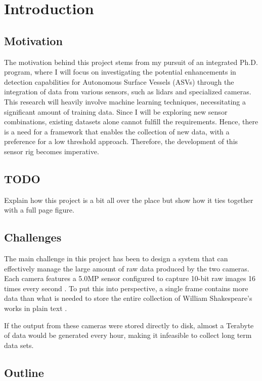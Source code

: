 \chapter{Introduction}

\section{Motivation}

The motivation behind this project stems from my pursuit of an integrated Ph.D.
program, where I will focus on investigating the potential enhancements in detection capabilities for Autonomous Surface Vessels (ASVs) through the integration of data from various sensors, such as lidars and specialized cameras.
This research will heavily involve machine learning techniques, necessitating a significant amount of training data.
Since I will be exploring new sensor combinations, existing datasets alone cannot fulfill the requirements.
Hence, there is a need for a framework that enables the collection of new data, with a preference for a low threshold approach.
Therefore, the development of this sensor rig becomes imperative.


\section{TODO}
Explain how this project is a bit all over the place but show how it ties together with a full page figure.

\section{Challenges}
The main challenge in this project has been to design a system that can effectively manage the large amount of raw data produced by the two cameras.
Each camera features a 5.0MP sensor configured to capture 10-bit raw images 16 times every second \cite{lucidvisionlabsTriton0MPPolarization}.
To put this into perspective, a single frame contains more data than what is needed to store the entire collection of William Shakespeare's works in plain text \cite{projectgutenbergCompleteWorksWilliam1994}.

If the output from these cameras were stored directly to disk, almost a Terabyte of data would be generated every hour, making it infeasible to collect long term data sets.


\section{Outline}
\todo


